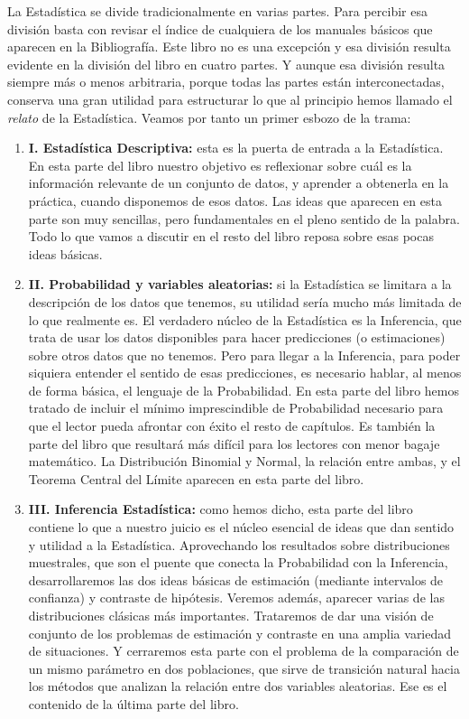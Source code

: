 \noindent La Estadística se divide tradicionalmente en varias partes. Para percibir esa división basta con revisar el índice de cualquiera de los manuales básicos que aparecen en la Bibliografía. Este libro no es una excepción y esa división resulta evidente en la división del libro en cuatro partes. Y aunque esa división resulta siempre más o menos arbitraria, porque todas las partes están interconectadas, conserva una gran utilidad para estructurar lo que al principio hemos llamado el {\em relato} de la Estadística. Veamos por tanto un primer esbozo de la trama:

\begin{enumerate}
  \item[]{\bf I. Estadística Descriptiva:} esta es la puerta de entrada a la Estadística. En esta parte del libro nuestro objetivo es reflexionar sobre cuál es la información relevante de un conjunto de datos, y aprender a obtenerla en la práctica, cuando disponemos de esos datos. Las ideas que aparecen en esta parte son muy sencillas, pero fundamentales en el pleno sentido de la palabra. Todo lo que vamos a discutir en el resto del libro reposa sobre esas pocas ideas básicas.

  \item[]{\bf II. Probabilidad y variables aleatorias:} si la Estadística se limitara a la descripción de los datos que tenemos, su utilidad sería mucho más limitada de lo que realmente es. El verdadero núcleo de la Estadística es la Inferencia, que trata de usar los datos disponibles para hacer predicciones (o estimaciones) sobre otros datos que no tenemos. Pero para llegar a la Inferencia, para poder siquiera entender el sentido de esas predicciones, es necesario hablar, al menos de forma básica, el lenguaje de la Probabilidad. En esta parte del libro hemos tratado de incluir el mínimo imprescindible de Probabilidad necesario para que el lector pueda afrontar con éxito el resto de capítulos. Es también la parte del libro que resultará más difícil para los lectores con menor bagaje matemático. La Distribución Binomial y Normal, la relación entre ambas, y el Teorema Central del Límite aparecen en esta parte del libro.

  \item[]{\bf III. Inferencia Estadística:} como hemos dicho, esta parte del libro contiene lo que a nuestro juicio es el núcleo esencial de ideas que dan sentido y utilidad a la Estadística. Aprovechando los resultados sobre distribuciones muestrales, que son el puente que conecta la Probabilidad con la Inferencia, desarrollaremos las dos ideas básicas de estimación (mediante intervalos de confianza) y contraste de hipótesis. Veremos además, aparecer varias de las distribuciones clásicas más importantes. Trataremos de dar una visión de conjunto de los problemas de estimación y contraste en una amplia variedad de situaciones. Y cerraremos esta parte con el problema de la comparación de un mismo parámetro en dos poblaciones, que sirve de transición natural hacia los métodos que analizan la relación entre dos variables aleatorias. Ese es el contenido de la última parte del libro.


\end{enumerate}
